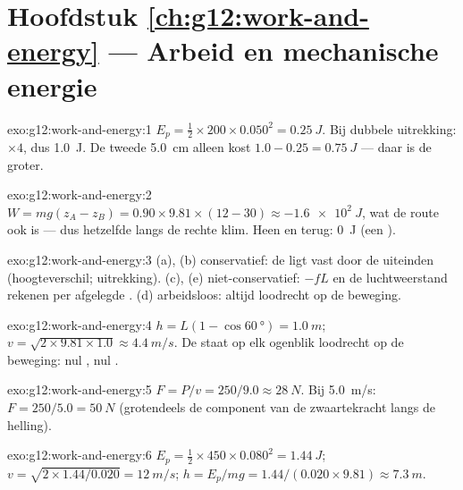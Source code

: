 \section*{Hoofdstuk \ref{ch:g12:work-and-energy} --- Arbeid en mechanische energie}

\begin{solution}{exo:g12:work-and-energy:1}
$E_p = \tfrac12 \times 200 \times 0.050^2 = \qty{0.25}{J}$. Bij dubbele
uitrekking: $\times 4$, dus \qty{1.0}{J}. De tweede \qty{5.0}{cm} alleen kost
$1.0 - 0.25 = \qty{0.75}{J}$ --- daar is de  groter.
\end{solution}

\begin{solution}{exo:g12:work-and-energy:2}
$W = mg(z_A - z_B) = 0.90 \times 9.81 \times (12 - 30) \approx
\qty{-1.6e2}{J}$, wat de route ook is --- dus hetzelfde langs de rechte klim.
Heen en terug: \qty{0}{J} (een ).
\end{solution}

\begin{solution}{exo:g12:work-and-energy:3}
(a), (b) conservatief: de  ligt vast door de uiteinden (hoogteverschil;
uitrekking). (c), (e) niet-conservatief: $-fL$ en de luchtweerstand rekenen per
afgelegde . (d) arbeidsloos: altijd loodrecht op de beweging.
\end{solution}

\begin{solution}{exo:g12:work-and-energy:4}
$h = L(1 - \cos\qty{60}{\degree}) = \qty{1.0}{m}$;
$v = \sqrt{2 \times 9.81 \times 1.0} \approx \qty{4.4}{m/s}$. De 
staat op elk ogenblik loodrecht op de beweging: nul , nul .
\end{solution}

\begin{solution}{exo:g12:work-and-energy:5}
$F = P/v = 250/9.0 \approx \qty{28}{N}$. Bij \qty{5.0}{m/s}:
$F = 250/5.0 = \qty{50}{N}$ (grotendeels de component van de zwaartekracht
langs de helling).
\end{solution}

\begin{solution}{exo:g12:work-and-energy:6}
$E_p = \tfrac12 \times 450 \times 0.080^2 = \qty{1.44}{J}$;
$v = \sqrt{2 \times 1.44/0.020} = \qty{12}{m/s}$;
$h = E_p/mg = 1.44/(0.020 \times 9.81) \approx \qty{7.3}{m}$.
\end{solution}

